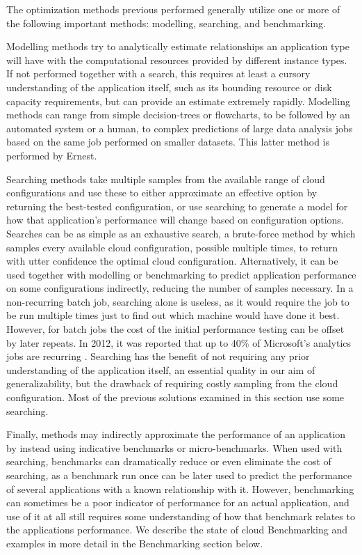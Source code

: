 \documentclass{report}
\begin{document}
The optimization methods previous performed generally utilize one or more of the following important methods: modelling, searching, and benchmarking. 

Modelling methods try to analytically estimate relationships an application type will have with the computational resources provided by different instance types. If not performed together with a search, this requires at least a cursory understanding of the application itself, such as its bounding resource or disk capacity requirements, but can provide an estimate extremely rapidly. Modelling methods can range from simple decision-trees or flowcharts, to be followed by an automated system or a human, to complex predictions of large data analysis jobs based on the same job performed on smaller datasets. This latter method is performed by Ernest\cite{Venkataraman2016}.

Searching methods take multiple samples from the available range of cloud configurations and use these to either approximate an effective option by returning the best-tested configuration, or use searching to generate a model for how that application's performance will change based on configuration options. Searches can be as simple as an exhaustive search, a brute-force method by which samples every available cloud configuration, possible multiple times, to return with utter confidence the optimal cloud configuration. Alternatively, it can be used together with modelling or benchmarking to predict application performance on some configurations indirectly, reducing the number of samples necessary.
In a non-recurring batch job, searching alone is useless, as it would require the job to be run multiple times just to find out which machine would have done it best. However, for batch jobs the cost of the initial performance testing can be offset by later repeats. In 2012, it was reported that up to 40\% of Microsoft's analytics jobs are recurring \cite{Agarwal2012,Ferguson2012b}. Searching has the benefit of not requiring any prior understanding of the application itself, an essential quality in our aim of generalizability, but the drawback of requiring costly sampling from the cloud configuration. Most of the previous solutions examined in this section use some searching.

Finally, methods may indirectly approximate the performance of an application by instead using indicative benchmarks or micro-benchmarks. When used with searching, benchmarks can dramatically reduce or even eliminate the cost of searching, as a benchmark run once can be later used to predict the performance of several applications with a known relationship with it. However, benchmarking can sometimes be a poor indicator of performance for an actual application, and use of it at all still requires some understanding of how that benchmark relates to the applications performance. We describe the state of cloud Benchmarking and examples in more detail in the Benchmarking section below.
\end{document}
